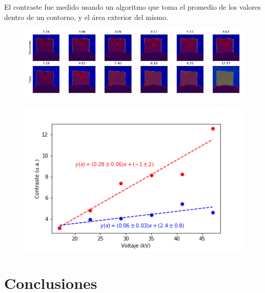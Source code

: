 \documentclass{sciposter}
\begin{document}
\begin{multicols}{3}
	El contraste fue medido usando un algoritmo que toma el promedio de los valores dentro de un contorno, y el área exterior del mismo.
	
	\begin{figure}[h]
		\centering
		\includegraphics[width = \linewidth]{Figuras/ContrasteImages.png}
	\end{figure}
	
	\begin{figure}[h]
		\centering
		\includegraphics[width = 0.9\linewidth]{Figuras/Contraste.png}
	\end{figure}

\section{Conclusiones}


\end{multicols}
\end{document}
